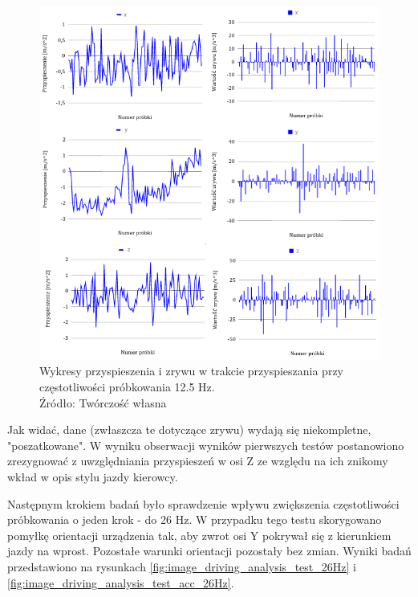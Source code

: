 \begin{figure}[H]
	\centering
	\includegraphics[width=12cm]{img/driving_analysis/12_5Hz_Przyspieszanie.png}
	\caption{Wykresy przyspieszenia i zrywu w trakcie przyspieszania przy częstotliwości próbkowania 12.5 Hz.
	\\Źródło: Twórczość własna}
	\label{fig:image_driving_analysis_test_12Hz}
\end{figure}

Jak widać, dane (zwłaszcza te dotyczące zrywu) wydają się niekompletne, "poszatkowane". W wyniku obserwacji wyników pierwszych testów postanowiono zrezygnować z uwzględniania przyspieszeń w osi Z ze względu na ich znikomy wkład w opis stylu jazdy kierowcy.

Następnym krokiem badań było sprawdzenie wpływu zwiększenia częstotliwości próbkowania o jeden krok - do 26 Hz. W przypadku tego testu skorygowano pomyłkę orientacji urządzenia tak, aby zwrot osi Y pokrywał się z kierunkiem jazdy na wprost. Pozostałe warunki orientacji pozostały bez zmian. Wyniki badań przedstawiono na rysunkach \ref{fig:image_driving_analysis_test_26Hz} i \ref{fig:image_driving_analysis_test_acc_26Hz}.

